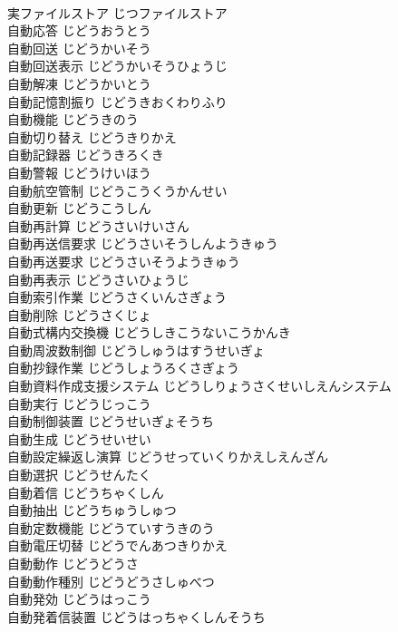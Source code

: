 \documentclass[8pt]{extreport}
\begin{document}
\begin{CJK}{UTF8}{min}
\\	実ファイルストア	じつファイルストア	
\\	自動応答	じどうおうとう	
\\	自動回送	じどうかいそう	
\\	自動回送表示	じどうかいそうひょうじ	
\\	自動解凍	じどうかいとう	
\\	自動記憶割振り	じどうきおくわりふり	
\\	自動機能	じどうきのう	
\\	自動切り替え	じどうきりかえ	
\\	自動記録器	じどうきろくき	
\\	自動警報	じどうけいほう	
\\	自動航空管制	じどうこうくうかんせい	
\\	自動更新	じどうこうしん	
\\	自動再計算	じどうさいけいさん	
\\	自動再送信要求	じどうさいそうしんようきゅう	
\\	自動再送要求	じどうさいそうようきゅう	
\\	自動再表示	じどうさいひょうじ	
\\	自動索引作業	じどうさくいんさぎょう	
\\	自動削除	じどうさくじょ	
\\	自動式構内交換機	じどうしきこうないこうかんき	
\\	自動周波数制御	じどうしゅうはすうせいぎょ	
\\	自動抄録作業	じどうしょうろくさぎょう	
\\	自動資料作成支援システム	じどうしりょうさくせいしえんシステム	
\\	自動実行	じどうじっこう	
\\	自動制御装置	じどうせいぎょそうち	
\\	自動生成	じどうせいせい	
\\	自動設定繰返し演算	じどうせっていくりかえしえんざん	
\\	自動選択	じどうせんたく	
\\	自動着信	じどうちゃくしん	
\\	自動抽出	じどうちゅうしゅつ	
\\	自動定数機能	じどうていすうきのう	
\\	自動電圧切替	じどうでんあつきりかえ	
\\	自動動作	じどうどうさ	
\\	自動動作種別	じどうどうさしゅべつ	
\\	自動発効	じどうはっこう	
\\	自動発着信装置	じどうはっちゃくしんそうち	

\end{CJK}
\end{document}
